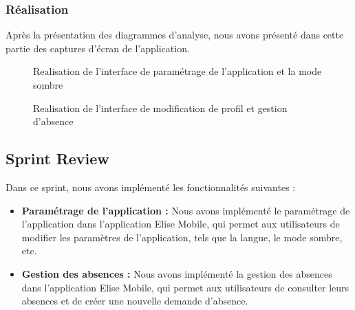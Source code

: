 \subsubsection{Réalisation}

Après la présentation des diagrammes d'analyse, nous avons présenté dans cette partie des captures d'écran de l'application.
\begin{figure}[H]
  \centering
  \caption{Realisation de l'interface de paramétrage de l'application et la mode sombre}
  \label{fig:RealisationInterfaceParametrage}
\end{figure}

\begin{figure}[H]
  \centering
  \caption{Realisation de l'interface de modification de profil et gestion d'absence}
  \label{fig:RealisationInterfaceModificationProfil}
\end{figure}

\subsection{Sprint Review}
Dans ce sprint, nous avons implémenté les fonctionnalités suivantes :
\begin{itemize}
  \item \textbf{Paramétrage de l'application :} Nous avons implémenté le paramétrage de l'application dans l'application Elise Mobile, qui permet aux utilisateurs de modifier les paramètres de l'application, tels que la langue, le mode sombre, etc.\\
  \item \textbf{Gestion des absences :} Nous avons implémenté la gestion des absences dans l'application Elise Mobile, qui permet aux utilisateurs de consulter leurs absences et de créer une nouvelle demande d'absence.\\
\end{itemize}
